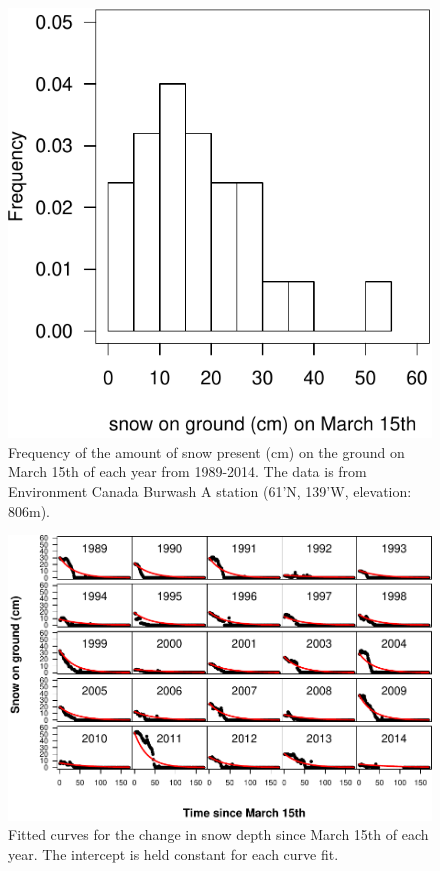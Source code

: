 \documentclass[12pt,]{article}
\begin{document}
\begin{figure}
\centering
\includegraphics{White_et_al_pika_phenology_supp_mat_files/figure-latex/unnamed-chunk-1-1.pdf}
\caption{Frequency of the amount of snow present (cm) on the ground on
March 15th of each year from 1989-2014. The data is from Environment
Canada Burwash A station (61'N, 139'W, elevation:
806m).\label{fig:E0_plot}}
\end{figure}

\begin{figure}
\centering
\includegraphics{White_et_al_pika_phenology_supp_mat_files/figure-latex/unnamed-chunk-2-1.pdf}
\caption{Fitted curves for the change in snow depth since March 15th of
each year. The intercept is held constant for each curve
fit.\label{fig:snow_fit_plot}}
\end{figure}
\end{document}
